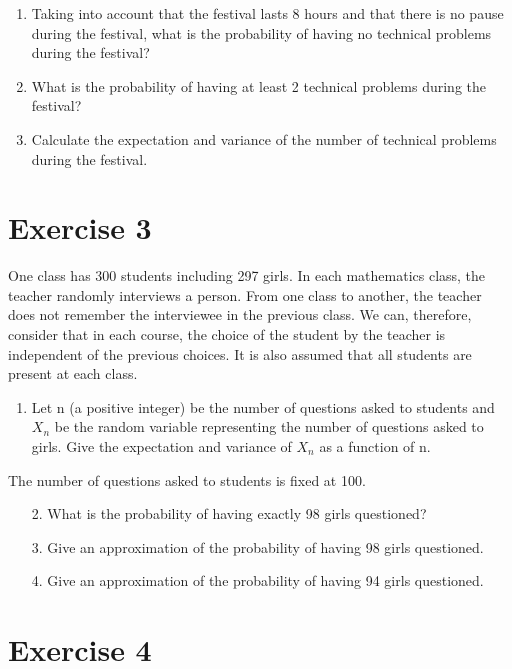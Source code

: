 \documentclass[12pt,thmsa]{article}
\begin{document}
\begin{enumerate}
\item Taking into account that the festival lasts 8 hours and that there is no pause during
the festival, what is the probability of having no technical problems during the
festival?
\item What is the probability of having at least 2 technical problems during the festival?
\item Calculate the expectation and variance of the number of technical problems during the
festival.
\end{enumerate}



\section*{Exercise 3}

One class has 300 students including 297 girls. In each mathematics class, the
teacher randomly interviews a person. From one class to another, the teacher does not remember the interviewee in the previous class. We can, therefore, consider that in each course, the choice of the student by the teacher is independent of the previous choices. It is also assumed that all students are present at each class.

\begin{enumerate}
\item Let n (a positive integer) be the number of questions asked to students and $X_n$ be the random variable representing the number of questions asked to girls. Give the expectation and variance of $X_n$ as a function of n.
\end{enumerate}
\medskip

The number of questions asked to students is fixed at 100.

\begin{enumerate}
\item[2.] What is the probability of having exactly 98 girls questioned?
\item[3.] Give an approximation of the probability of having 98 girls questioned.
\item[4.] Give an approximation of the probability of having 94 girls questioned.
\end{enumerate}



\section*{Exercise 4}
\end{document}
